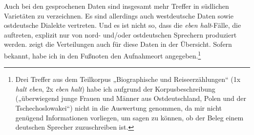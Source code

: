 Auch bei den gesprochenen Daten sind insgesamt mehr Treffer in südlichen Varietäten zu verzeichnen. Es sind allerdings auch westdeutsche Daten sowie ostdeutsche Dialekte vertreten. Und es ist nicht so, dass die \textit{eben halt}-Fälle, die auftreten, explizit nur von nord- und/oder ostdeutschen Sprechern produziert werden.  zeigt die Verteilungen auch für diese Daten in der Übersicht. Sofern bekannt, habe ich in den Fußnoten den Aufnahmeort angegeben.\footnote{Drei Treffer aus dem Teilkorpus „Biographische und Reiseerzählungen“ (1x \textit{halt eben}, 2x \textit{eben halt}) habe ich aufgrund der Korpusbeschreibung („überwiegend junge Frauen und Männer aus Ostdeutschland, Polen und der Tschechoslowakei“) nicht in die Auswertung genommen, da mir nicht genügend Informationen vorliegen, um sagen zu können, ob der Beleg einem deutschen Sprecher zuzuschreiben ist.}

